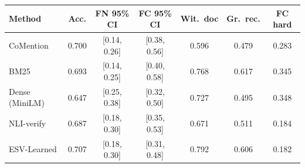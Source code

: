 \setlength{\tabcolsep}{2.5pt}
\begin{tabular}{lcccccc}
\toprule
Method & Acc. & FN 95\% CI & FC 95\% CI & Wit.\ doc & Gr.\ rec. & FC hard \\
\midrule
CoMention & 0.700 & [0.14, 0.26] & [0.38, 0.56] & 0.596 & 0.479 & 0.283 \\
BM25 & 0.693 & [0.14, 0.25] & [0.40, 0.58] & 0.768 & 0.617 & 0.345 \\
Dense (MiniLM) & 0.647 & [0.25, 0.38] & [0.32, 0.50] & 0.727 & 0.495 & 0.348 \\
NLI-verify & 0.687 & [0.18, 0.30] & [0.35, 0.53] & 0.671 & 0.511 & 0.184 \\
ESV-Learned & 0.707 & [0.18, 0.30] & [0.31, 0.48] & 0.792 & 0.606 & 0.182 \\
\bottomrule
\end{tabular}
